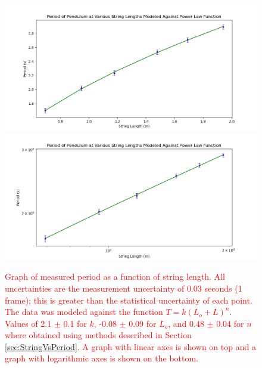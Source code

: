 \documentclass[11pt]{article}
\begin{document}
        \begin{figure}[H]
            \includegraphics[width = \textwidth]{PowerFitLengths.png}
            \includegraphics[width = \textwidth]{LogFitForLengths.png}
            \caption{\textcolor{red}{Graph of measured period as a function of string length. All uncertainties are the measurement uncertainty of 0.03 seconds (1 frame); this is greater than the statistical uncertainty of each point. The data was modeled against the function $T = k(L_o + L)^n$. Values of 2.1 $\pm$ 0.1 for $k$, -0.08 $\pm$ 0.09 for $L_o$, and 0.48 $\pm$ 0.04 for $n$ where obtained using methods described in Section \ref{sec:StringVsPeriod}. A graph with linear axes is shown on top and a graph with logarithmic axes is shown on the bottom.
            \label{fig:GraphedLengths}}}
        \end{figure}
\end{document}
